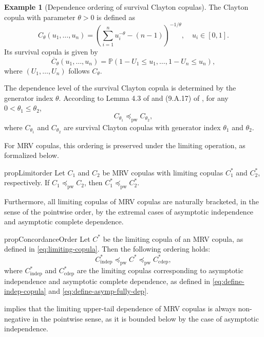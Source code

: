 \documentclass[12pt]{article}
\theoremstyle{plain}
\theoremstyle{plain}
\theoremstyle{definition}
\newtheorem{exmp}{Example}[section]
\renewcommand{\Pr}{\mathbb{P}}
\begin{document}
\begin{exmp}[Dependence ordering of survival Clayton copulas]
\label{exmp:clayton-dependence}
The Clayton copula with parameter $\theta > 0$ is defined as
\[
C_\theta(u_1,\dots,u_n)
= \left( \sum_{i=1}^n u_i^{-\theta} - (n-1) \right)^{-1/\theta}, \quad u_i \in [0,1].
\]
Its survival copula is given by
\[
\overline{C}_\theta(u_1,\dots,u_n)
= \Pr(1-U_1 \le u_1,\dots,1-U_n \le u_n),
\]
where $(U_1,\dots,U_n)$ follows $C_\theta$.

The dependence level of the survival Clayton copula is determined by the generator index $\theta$. 
According to Lemma 4.3 of \citet{embrechts2009additivity} and (9.A.17) of \citet{shaked2007stochastic}, for any $0 < \theta_1 \le \theta_2$, 
\[
C_{\theta_1}\preceq_{\mathrm{pw}} C_{\theta_2},
\]
where $C_{\theta_1}$ and $C_{\theta_2}$ are survival Clayton copulas with generator index $\theta_1$ and $\theta_2$.
\end{exmp}

For MRV copulas, this ordering is preserved under the limiting operation, as formalized below.
\begin{restatable}{prop}{Limitorder}
\label{prop:limit-preserve-concordance-order}
Let $C_1$ and $C_2$ be MRV copulas with limiting copulas $C_1^*$ and $C_2^*$, respectively. If $C_1 \preceq_{\mathrm{pw}} C_2$, then $C_1^* \preceq_{\mathrm{pw}} C_2^*$.
\end{restatable}


Furthermore, all limiting copulas of MRV copulas are naturally bracketed, in the sense of the pointwise order, by the extremal cases of asymptotic independence and asymptotic complete dependence.
\begin{restatable}{prop}{ConcordanceOrder}
\label{prop:concordance-order-upper-and-lower-bound}
Let $C^*$ be the limiting copula of an MRV copula, as defined in \eqref{eq:limiting-copula}. Then the following ordering holds:
\begin{equation}
\label{eq:concordance-order-upper-and-lower-bound}
C^*_{\mathrm{indep}}\preceq_{\mathrm{pw}}C^*\preceq_{\mathrm{pw}}C^*_{\mathrm{cdep}},
\end{equation}
where $C^*_{\mathrm{indep}}$ and $C^*_{\mathrm{cdep}}$ are the limiting copulas corresponding to asymptotic independence and asymptotic complete dependence, as defined in \eqref{eq:define-indep-copula} and \eqref{eq:define-asymp-fully-dep}.
\end{restatable}

 implies that the limiting upper-tail dependence of MRV copulas is always non-negative in the pointwise sense, as it is bounded below by the case of asymptotic independence.
\end{document}
